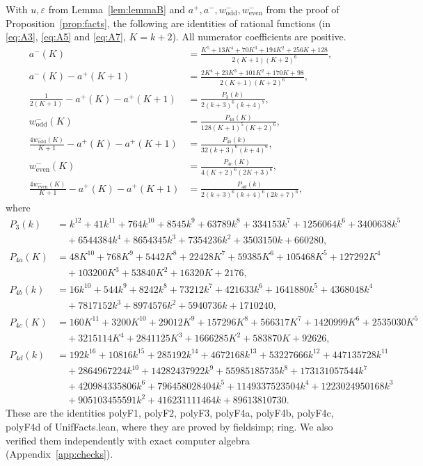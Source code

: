 \documentclass[11pt]{amsart}
\theoremstyle{definition}
\theoremstyle{remark}
\numberwithin{equation}{section}
\newcommand{\aup}{a^{+}}
\newcommand{\alo}{a^{-}}
\newcommand{\leanus}{\textunderscore\allowbreak}
\newcommand{\lean}[1]{{\ttfamily\let\_\leanus #1}}
\begin{document}
With $u,\varepsilon$ from Lemma~\ref{lem:lemmaB} and $\aup,\alo,w^-_{\mathrm{odd}},w^-_{\mathrm{even}}$
from the proof of Proposition~\ref{prop:facts}, the following are identities of rational functions (in
\eqref{eq:A3}, \eqref{eq:A5} and \eqref{eq:A7}, $K=k+2$). All numerator coefficients are positive.
\begin{align}
  \alo(K)&=\frac{K^5+13K^4+70K^3+194K^2+256K+128}{2(K+1)(K+2)^6},\label{eq:A1}\\
  \alo(K)-\aup(K+1)&=\frac{2K^4+23K^3+101K^2+170K+98}{2(K+1)(K+2)^6},\label{eq:A2}\\
  \frac1{2(K+1)}-\aup(K)-\aup(K+1)&=\frac{P_3(k)}{2(k+3)^6(k+4)^7},\label{eq:A3}\\
  w^-_{\mathrm{odd}}(K)&=\frac{P_{4a}(K)}{128(K+1)^5(K+2)^6},\label{eq:A4}\\
  \frac{4w^-_{\mathrm{odd}}(K)}{K+1}-\aup(K)-\aup(K+1)&=\frac{P_{4b}(k)}{32(k+3)^6(k+4)^6},\label{eq:A5}\\
  w^-_{\mathrm{even}}(K)&=\frac{P_{4c}(K)}{4(K+2)^6(2K+3)^6},\label{eq:A6}\\
  \frac{4w^-_{\mathrm{even}}(K)}{K+1}-\aup(K)-\aup(K+1)&=\frac{P_{4d}(k)}{2(k+3)^6(k+4)^6(2k+7)^6},\label{eq:A7}
\end{align}
where
\begin{align*}
P_3(k)&=k^{12}+41k^{11}+764k^{10}+8545k^9+63789k^8+334153k^7+1256064k^6+3400638k^5\\
&\quad+6544384k^4+8654345k^3+7354236k^2+3503150k+660280,\\
P_{4a}(K)&=48K^{10}+768K^9+5442K^8+22428K^7+59385K^6+105468K^5+127292K^4\\
&\quad+103200K^3+53840K^2+16320K+2176,\\
P_{4b}(k)&=16k^{10}+544k^9+8242k^8+73212k^7+421633k^6+1641880k^5+4368048k^4\\
&\quad+7817152k^3+8974576k^2+5940736k+1710240,\\
P_{4c}(K)&=160K^{11}+3200K^{10}+29012K^9+157296K^8+566317K^7+1420999K^6+2535030K^5\\
&\quad+3215114K^4+2841125K^3+1666285K^2+583870K+92626,\\
P_{4d}(k)&=192k^{16}+10816k^{15}+285192k^{14}+4672168k^{13}+53227666k^{12}+447135728k^{11}\\
&\quad+2864967224k^{10}+14282437922k^9+55985185735k^8+173131057544k^7\\
&\quad+420984335806k^6+796458028404k^5+1149337523504k^4+1223024950168k^3\\
&\quad+905103455591k^2+416231111464k+89613810730.
\end{align*}
These are the identities \lean{poly\_F1}, \lean{poly\_F2}, \lean{poly\_F3}, \lean{poly\_F4a},
\lean{poly\_F4b}, \lean{poly\_F4c}, \lean{poly\_F4d} of \lean{UnifFacts.lean}, where they are proved by
\lean{field\_simp; ring}. We also verified them independently with exact computer algebra
(Appendix~\ref{app:checks}).
\end{document}
